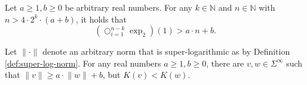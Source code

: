 \begin{lemma}
	\label{lemma:cascade-exp-inequality-basis-placeholder}
	Let $a\geq 1,b\geq 0$ be arbitrary real numbers.
	For any $k\in\mathbb{N}$ and $n\in\mathbb{N}$ with $n>4\cdot 2^k\cdot (a+b)$, it holds that
	\begin{equation}
		\left(\bigcirc_{i=1}^{n-k}\exp_2\right)(1) > a\cdot n + b.
	\end{equation}
\end{lemma}
\begin{theorem}
	Let $\lVert \cdot \rVert$ denote an arbitrary norm that is super-logarithmic as by Definition \ref{def:super-log-norm}.
	For any real numbers $a\geq 1, b\geq 0$, there are $v,w\in\Sigma^{\infty}$ such that $\lVert v \rVert\geq a\cdot \lVert w \rVert+b$, but $K(v) < K(w)$. 
\end{theorem}

